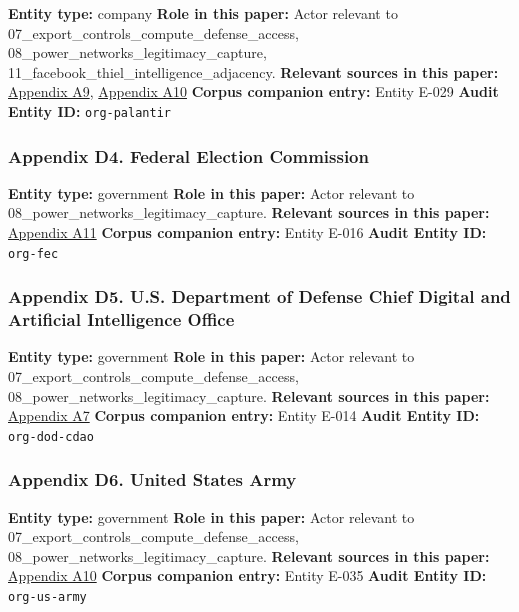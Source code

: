 \documentclass[
  american,
  11pt,
  letterpaper,
]{article}
\begin{document}
\textbf{Entity type:} company \textbf{Role in this paper:} Actor
relevant to 07\_export\_controls\_compute\_defense\_access,
08\_power\_networks\_legitimacy\_capture,
11\_facebook\_thiel\_intelligence\_adjacency. \textbf{Relevant sources
in this paper:}
\hyperref[ch-08-appendix-a9-anthropic-and-palantir-partner-to-bring-claude-ai-models-to-aws-for-u-s-government-intelligence-and-defense-operations]{Appendix
A9},
\hyperref[ch-08-appendix-a10-army-launches-detachment-201-executive-innovation-corps-to-drive-tech-transformation]{Appendix
A10} \textbf{Corpus companion entry:} Entity E-029 \textbf{Audit Entity
ID:} \texttt{org-palantir}

\subsubsection{Appendix D4. Federal Election
Commission}\label{ch-08-appendix-d4-federal-election-commission}

\textbf{Entity type:} government \textbf{Role in this paper:} Actor
relevant to 08\_power\_networks\_legitimacy\_capture. \textbf{Relevant
sources in this paper:}
\hyperref[ch-08-appendix-a11-leading-the-future-committee-overview]{Appendix
A11} \textbf{Corpus companion entry:} Entity E-016 \textbf{Audit Entity
ID:} \texttt{org-fec}

\subsubsection{Appendix D5. U.S. Department of Defense Chief Digital and
Artificial Intelligence
Office}\label{ch-08-appendix-d5-u-s-department-of-defense-chief-digital-and-artificial-intelligence-office}

\textbf{Entity type:} government \textbf{Role in this paper:} Actor
relevant to 07\_export\_controls\_compute\_defense\_access,
08\_power\_networks\_legitimacy\_capture. \textbf{Relevant sources in
this paper:}
\hyperref[ch-08-appendix-a7-introducing-openai-for-government]{Appendix
A7} \textbf{Corpus companion entry:} Entity E-014 \textbf{Audit Entity
ID:} \texttt{org-dod-cdao}

\subsubsection{Appendix D6. United States
Army}\label{ch-08-appendix-d6-united-states-army}

\textbf{Entity type:} government \textbf{Role in this paper:} Actor
relevant to 07\_export\_controls\_compute\_defense\_access,
08\_power\_networks\_legitimacy\_capture. \textbf{Relevant sources in
this paper:}
\hyperref[ch-08-appendix-a10-army-launches-detachment-201-executive-innovation-corps-to-drive-tech-transformation]{Appendix
A10} \textbf{Corpus companion entry:} Entity E-035 \textbf{Audit Entity
ID:} \texttt{org-us-army}
\end{document}
